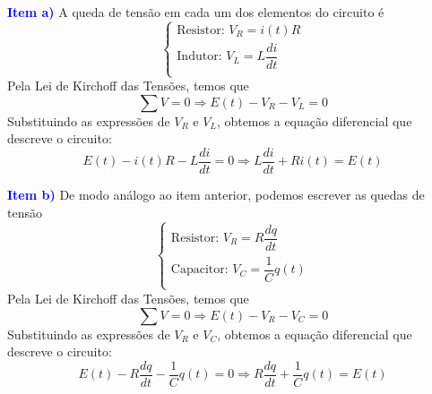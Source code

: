 \documentclass[oneside,12pt,a4paper]{report}
\begin{document}
        \begin{tcolorbox}[enhanced, breakable, colback=blue!1!white,colframe=blue!75!black,title=\textbf{\hyperlink{quest:ex12}{\hypertarget{resp:ex12}{Exercício 12}}}]
            \noindent\textcolor{blue}{\textbf{Item a)}} A queda de tensão em cada um dos elementos do circuito é
            \[\begin{cases}
                \text{Resistor: } V_R = i(t)R\\
                \text{Indutor: } V_L = L\dfrac{di}{dt}\\
            \end{cases}\]
            \noindent Pela Lei de Kirchoff das Tensões, temos que
            \[\sum V=0\Rightarrow E(t)-V_R-V_L=0\]
            \noindent Substituindo as expressões de $V_R$ e $V_L$, obtemos a equação diferencial que descreve o circuito:
            \[E(t) - i(t)R - L\frac{di}{dt} = 0 \Rightarrow \boxed{L\frac{di}{dt} + Ri(t) = E(t)}\]

            \noindent\textcolor{blue}{\textbf{Item b)}} De modo análogo ao item anterior, podemos escrever as quedas de tensão 
            \[\begin{cases}
                \text{Resistor: } V_R = R\dfrac{dq}{dt}\\
                \text{Capacitor: } V_C = \dfrac{1}{C}q(t)\\
            \end{cases}\]
            \noindent Pela Lei de Kirchoff das Tensões, temos que
            \[\sum V=0\Rightarrow E(t)-V_R-V_C=0\]
            \noindent Substituindo as expressões de $V_R$ e $V_C$, obtemos a equação diferencial que descreve o circuito:
            \[E(t) - R\frac{dq}{dt} - \frac{1}{C}q(t) = 0 \Rightarrow \boxed{R\frac{dq}{dt} + \frac{1}{C}q(t) = E(t)}\]

        \end{tcolorbox}
\end{document}
